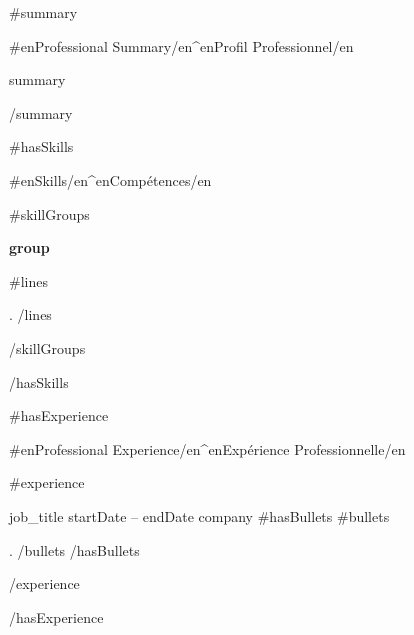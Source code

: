\documentclass{resume}
\newcommand{\plainitem}[1]{\item{#1}}
\begin{document}


{{#summary}}
\begin{rSection}{ {{#en}}Professional Summary{{/en}}{{^en}}Profil Professionnel{{/en}} }

{{{summary}}}

\end{rSection}
{{/summary}}


{{#hasSkills}}
\begin{rSection}{ {{#en}}Skills{{/en}}{{^en}}Compétences{{/en}} }

{{#skillGroups}}

\begin{rSubsectionNoBullet}{\bf {{{group}}}}{}{}{}

{{#lines}}
    \plainitem{ {{{.}}} }
{{/lines}}

\end{rSubsectionNoBullet}

{{/skillGroups}}

\end{rSection}
{{/hasSkills}}


{{#hasExperience}}
\begin{rSection}{ {{#en}}Professional Experience{{/en}}{{^en}}Expérience Professionnelle{{/en}} }

{{#experience}}

\begin{rSubsection}{ {{{job_title}}} }{ {{{startDate}}} -- {{{endDate}}} }{ {{{company}}} }{}
{{#hasBullets}}
    {{#bullets}}
    \item {{{.}}}
    {{/bullets}}
{{/hasBullets}}
\end{rSubsection}

{{/experience}}

\end{rSection}
{{/hasExperience}}
\end{document}
